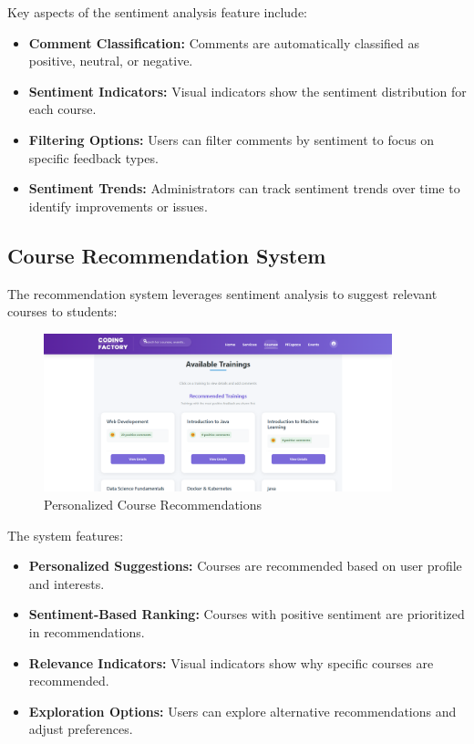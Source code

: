 \documentclass[12pt,a4paper]{report}
\begin{document}
Key aspects of the sentiment analysis feature include:

\begin{itemize}
    \item \textbf{Comment Classification:} Comments are automatically classified as positive, neutral, or negative.

    \item \textbf{Sentiment Indicators:} Visual indicators show the sentiment distribution for each course.

    \item \textbf{Filtering Options:} Users can filter comments by sentiment to focus on specific feedback types.

    \item \textbf{Sentiment Trends:} Administrators can track sentiment trends over time to identify improvements or issues.
\end{itemize}

\subsection{Course Recommendation System}

The recommendation system leverages sentiment analysis to suggest relevant courses to students:

\begin{figure}[!htbp]
\centering
\includegraphics[width=0.9\textwidth]{media/courses.png}
\caption{Personalized Course Recommendations}
\label{fig:course-recommendations}
\end{figure}

The system features:

\begin{itemize}
    \item \textbf{Personalized Suggestions:} Courses are recommended based on user profile and interests.

    \item \textbf{Sentiment-Based Ranking:} Courses with positive sentiment are prioritized in recommendations.

    \item \textbf{Relevance Indicators:} Visual indicators show why specific courses are recommended.

    \item \textbf{Exploration Options:} Users can explore alternative recommendations and adjust preferences.
\end{itemize}
\end{document}
